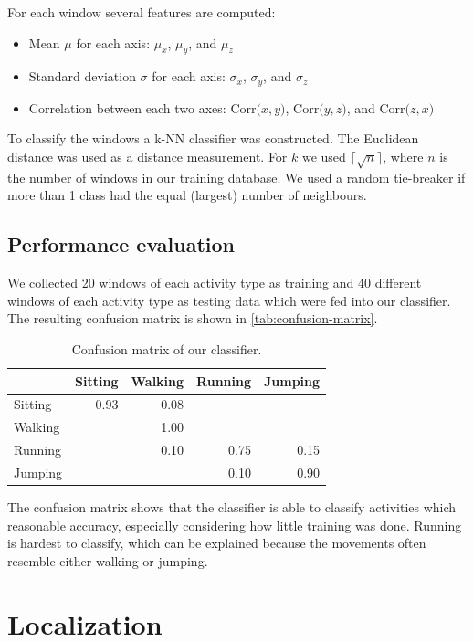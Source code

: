 \documentclass[a4paper,10pt,twoside]{IEEEtran}
\begin{document}
For each window several features are computed:

\begin{itemize}
\item Mean $\mu$ for each axis: $\mu_x$, $\mu_y$, and $\mu_z$
\item Standard deviation $\sigma$ for each axis: $\sigma_x$, $\sigma_y$, and $\sigma_z$
\item Correlation between each two axes:  $\text{Corr(}x,y{)}$, $\text{Corr(}y,z{)}$, and $\text{Corr(}z,x{)}$
\end{itemize}

To classify the windows a k-NN classifier was constructed.
The Euclidean distance was used as a distance measurement.
For $k$ we used  $\lceil\sqrt{n}\rceil$, where $n$ is the number of windows in our training database.
We used a random tie-breaker if more than 1 class had the equal (largest) number of neighbours. 

\subsection{Performance evaluation}
We collected 20 windows of each activity type as training and 40 different windows of each activity type as testing data which were fed into our classifier.
The resulting confusion matrix is shown in \autoref{tab:confusion-matrix}.

\begin{table}[ht]
\centering
\caption{Confusion matrix of our classifier.}
\begin{tabular}{lrrrr}
\toprule
& Sitting & Walking & Running & Jumping  \\
\midrule
Sitting & 0.93 &  0.08 &       &       \\
Walking &       & 1.00 &       &       \\
Running &       &  0.10 & 0.75 & 0.15 \\
Jumping &       &        & 0.10 & 0.90 \\
\bottomrule
\end{tabular}
\label{tab:confusion-matrix}
 \end{table}

The confusion matrix shows that the classifier is able to classify activities which reasonable accuracy, especially considering how little training was done.
Running is hardest to classify, which can be explained because the movements often resemble either walking or jumping.

\section{Localization}
\label{sec:localization}
\end{document}
